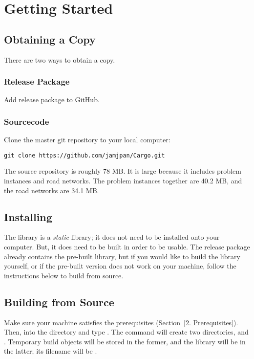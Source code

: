 \section{Getting Started}

\subsection{Obtaining a Copy}

There are two ways to obtain a copy.

\subsubsection{Release Package}

Add release package to GitHub.

\subsubsection{Sourcecode}

Clone the master  git repository to your local computer:
\begin{verbatim}
git clone https://github.com/jamjpan/Cargo.git
\end{verbatim}

The source repository is roughly 78 MB. It is large because it includes problem
instances and road networks. The problem instances together are 40.2 MB, and
the road networks are 34.1 MB.

\subsection{Installing}

The  library is a \emph{static} library; it does not need
to be installed onto your computer. But, it does need to be built in order to
be usable. The release package already contains the pre-built library, but if
you would like to build the library yourself, or if the pre-built version does
not work on your machine, follow the instructions below to build from source.

\subsection{Building from Source}

Make sure your machine satisfies the prerequisites (Section~\ref{2. Prerequisites}).
Then,  into the  directory and type . The
command will create two directories,  and . Temporary
build objects will be stored in the former, and the library will be in the latter;
its filename will be .

